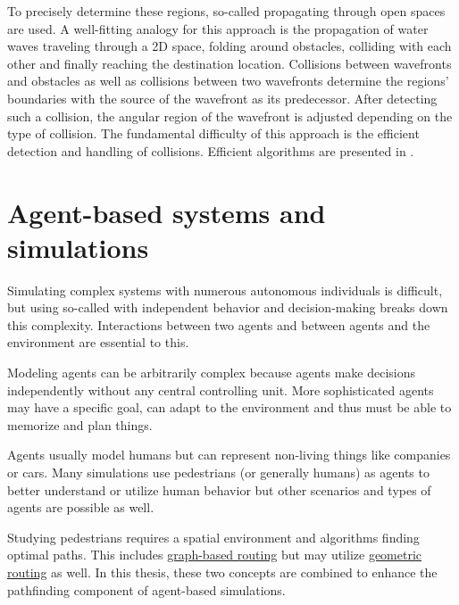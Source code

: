 		To precisely determine these regions, so-called  propagating through open spaces are used.
		A well-fitting analogy for this approach is the propagation of water waves traveling through a 2D space, folding around obstacles, colliding with each other and finally reaching the destination location.
		Collisions between wavefronts and obstacles as well as collisions between two wavefronts determine the regions' boundaries with the source of the wavefront as its predecessor.
		After detecting such a collision, the angular region of the wavefront is adjusted depending on the type of collision.
		The fundamental difficulty of this approach is the efficient detection and handling of collisions.
		Efficient algorithms are presented in .

\section{Agent-based systems and simulations}

	Simulating complex systems with numerous autonomous individuals is difficult, but using so-called  with independent behavior and decision-making breaks down this complexity\cite{macal-introductory-tutorial}.
	Interactions between two agents and between agents and the environment are essential to this.
	
	Modeling agents can be arbitrarily complex because agents make decisions independently without any central controlling unit.
	More sophisticated agents may have a specific goal, can adapt to the environment and thus must be able to memorize and plan things.
	
	Agents usually model humans but can represent non-living things like companies or cars.
	Many simulations use pedestrians (or generally humans) as agents to better understand or utilize human behavior but other scenarios and types of agents are possible as well\cite{macal-introductory-tutorial}.

	Studying pedestrians requires a spatial environment and algorithms finding optimal paths\cite{kneidl-borrmann-hartmann-navigation,gloor-hybrid-pedestrian-routing,teknomo-millonig-routing}.
	This includes \hyperref[sec:graph-routing]{graph-based routing} but may utilize \hyperref[sec:geometric-routing]{geometric routing} as well\cite{kneidl-borrmann-hartmann-navigation}.
	In this thesis, these two concepts are combined to enhance the pathfinding component of agent-based simulations.
	
